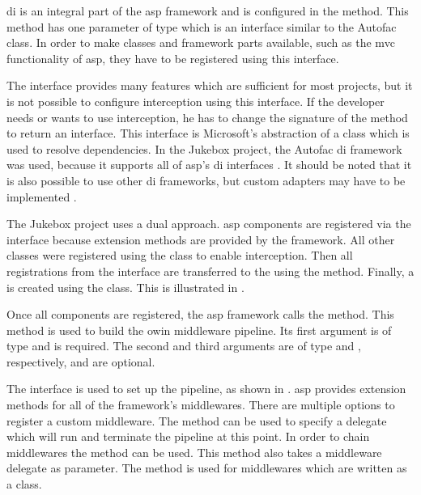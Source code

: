 \gls{di} is an integral part of the \gls{asp} framework and is configured in the  method. This method has one parameter of type  which is an interface similar to the Autofac  class. In order to make classes and framework parts available, such as the \gls{mvc} functionality of \gls{asp}, they have to be registered using this interface.

The  interface provides many features which are sufficient for most projects, but it is not possible to configure interception using this interface. If the developer needs or wants to use interception, he has to change the signature of the  method to return an  interface. This interface is Microsoft's abstraction of a  class which is used to resolve dependencies. In the Jukebox project, the Autofac \gls{di} framework was used, because it supports all of \gls{asp}'s \gls{di} interfaces \cite{autofacCoreDoc}. It should be noted that it is also possible to use other \gls{di} frameworks, but custom adapters may have to be implemented \cite{aspCustomDI}.

The Jukebox project uses a dual approach. \gls{asp} components are registered via the  interface because extension methods are provided by the framework. All other classes were registered using the  class to enable interception. Then all registrations from the  interface are transferred to the  using the  method. Finally, a  is created using the   class. This is illustrated in .


Once all components are registered, the \gls{asp} framework calls the  method. This method is used to build the \gls{owin} middleware pipeline. Its first argument is of type  and is required. The second and third arguments are of type  and , respectively, and are optional.

The  interface is used to set up the pipeline, as shown in . \gls{asp} provides extension methods for all of the framework's middlewares. There are multiple options to register a custom middleware. The  method can be used to specify a delegate which will run and terminate the pipeline at this point. In order to chain middlewares the  method can be used. This method also takes a middleware delegate as parameter. The  method is used for middlewares which are written as a class. \cite{aspMiddleware}

